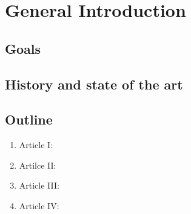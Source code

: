 
%	
		
	
	
\chapter{General Introduction}
\label{chap:intro}
\newpage


\section{Goals}
\label{sec:intro:goal}
\newpage


\section{History and state of the art}
\label{sec:intro:hist_soa}
\newpage




\section{Outline}
\label{sec:intro:outline}

\begin{enumerate}
	\item Article I:
	\item Artilce II:
	\item Article III:
	\item Article IV:
\end{enumerate}












